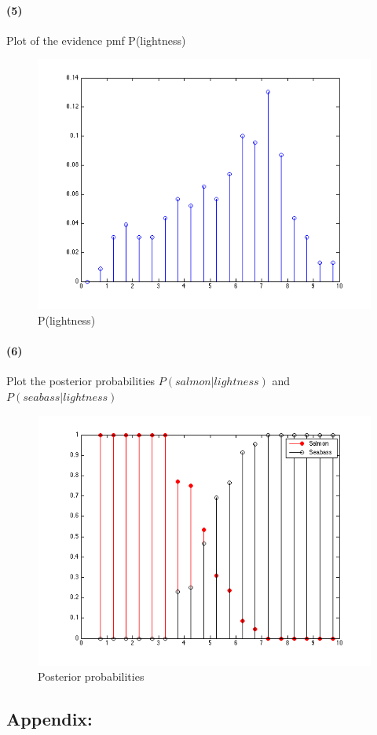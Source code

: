\documentclass[a4paper]{article}
\begin{document}
\paragraph{(5) } Plot of the evidence pmf P(lightness) ~\\
\begin{figure}[h!]
  \centering
    \includegraphics[scale=.6]{images/p_lightness.png}
  \caption{P(lightness)}
\end{figure}

%
%
\paragraph{(6) } Plot the posterior probabilities $P(salmon|lightness)$ and $P(seabass|lightness)$ ~\\
\begin{figure}[h!]
  \centering
    \includegraphics[scale=.6]{images/posterior_probabilities.png}
  \caption{Posterior probabilities}
\end{figure}

\newpage
\subsection*{Appendix:}

\end{document}
